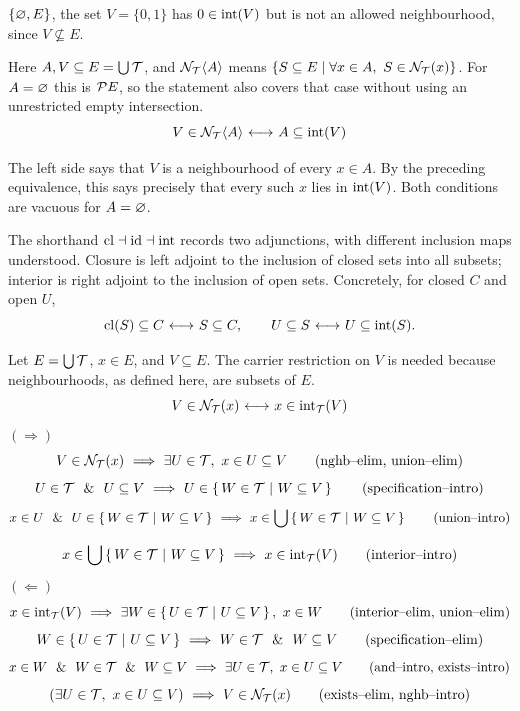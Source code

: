 $\{\varnothing,E\}$, the set $V=\{0,1\}$ has $0\in\mathrm{int}(V)$
but is not an allowed neighbourhood, since $V\nsubseteq E$.
\Done
\begin{theorem}
Here $A,V\subseteq E=\bigcup\mathcal{T}$, and
$\mathcal{N}_{\mathcal{T}}\langle A\rangle$ means
$\{S\subseteq E\mid\forall x\in A,\ S\in\nghbset_\topology(x)\}$.
For $A=\varnothing$ this is $\mathcal{P} E$, so the statement also covers
that case without using an unrestricted empty intersection.
\[
V\in \mathcal{N}_{\mathcal{T}}\langle A\rangle {\ \longleftrightarrow\ } A \subseteq \mathrm{int}(V)
\]
\end{theorem}
\Proof
The left side says that $V$ is a neighbourhood of every $x\in A$.
By the preceding equivalence, this says precisely that every such $x$
lies in $\mathrm{int}(V)$. Both conditions are vacuous for $A=\varnothing$.
\Done
\begin{note}
The shorthand $\mathrm{cl}\dashv\mbox{id}\dashv\mathrm{int}$ records two
adjunctions, with different inclusion maps understood. Closure is left
adjoint to the inclusion of closed sets into all subsets; interior is
right adjoint to the inclusion of open sets. Concretely, for closed $C$
and open $U$,
\[
\mathrm{cl}(S)\subseteq C{\ \longleftrightarrow\ } S\subseteq C,\qquad
U\subseteq S{\ \longleftrightarrow\ } U\subseteq\mathrm{int}(S).
\]
\end{note}

\newcommand*{\blipo}{\separation{W}{\topology}{W\subseteq V}}
\renewcommand*{\blipo}{\ccc{W}{W\in\topology}{W\subseteq V}}
\renewcommand*{\blipo}{\cc{W\in\topology}{W\subseteq V}}
\begin{theorem}
Let $E=\bigcup\mathcal{T}$, $x\in E$, and $V\subseteq E$.
The carrier restriction on $V$ is needed because neighbourhoods, as
defined here, are subsets of $E$.
\[
V\in\mathcal{N}_{\mathcal{T}}(x) {\ \longleftrightarrow\ } x\in \mathrm{int}_{\mathcal{T}}(V)
\]
\Proof
$(\Rightarrow)$
\[
V\in \mathcal{N}_{\mathcal{T}}(x) \ \Longrightarrow\  \exists U\in \mathcal{T},\  x\in U \subseteq V
\tag{nghb--elim, union--elim}
\]%
\[
U\in\topology\LAND U\subseteq V \IMPLIES U \in \blipo
\tag{specification--intro}
\]
\[
x\in U \LAND U \in \blipo \IMPLIES x\in \union \blipo
\tag{union--intro}
\]

\[
x\in \union \blipo \IMPLIES x\in \interior_\topology(V)
\tag{interior--intro}
\]
$(\Leftarrow)$
\[
x\in \mathrm{int}_{\mathcal{T}}(V) \ \Longrightarrow\  \exists W\in \left\{\,U\in\mathcal{T}\ \middle|\ U\subseteq V\,\right\},\ x\in W
\tag{interior--elim, union--elim}
\]
\[
W\in \left\{\,U\in\mathcal{T}\ \middle|\ U\subseteq V\,\right\} \ \Longrightarrow\  W\in\mathcal{T}\ \ \&\ \  W\subseteq V
\tag{specification--elim}
\]
\[
x\in W
\ \ \&\ \ 
W\in\mathcal{T}
\ \ \&\ \ 
W\subseteq V
\ \Longrightarrow\ 
\exists U\in \mathcal{T},\  x\in U \subseteq V
\tag{and--intro, exists--intro}
\]
\[
(\exists U\in \mathcal{T},\  x\in U \subseteq V)
\ \Longrightarrow\ 
V\in \mathcal{N}_{\mathcal{T}}(x)
\tag{exists--elim, nghb--intro}
\]
\DoneNoPar
\end{theorem}
\pagebreak
